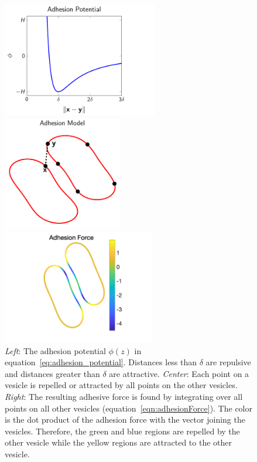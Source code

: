 \documentclass[prf,superscriptaddress,showpacs]{revtex4-1}
\begin{document}
\begin{figure}[htp]
  \begin{minipage}{0.31\textwidth}
    \centering
    \includegraphics[height=5cm,trim={0cm 0cm 2cm 0cm},clip]{figs/adhesionPotential.pdf}
  \end{minipage}
  \hfill
  \begin{minipage}{0.31\textwidth}
    \centering
    \includegraphics[height=5cm]{figs/configCartoon.pdf}
  \end{minipage}
  \hfill
  \begin{minipage}{0.31\textwidth}
    \centering
    \includegraphics[height=5cm,trim={3cm 0cm 2cm 0cm},clip]{figs/Adhesion_Force.png}
  \end{minipage}
  \caption{\label{fig:adhesionModel} {\em Left}: The adhesion potential
  $\phi(z)$ in equation~\eqref{eq:adhesion_potential}.  Distances less
  than $\delta$ are repulsive and distances greater than $\delta$ are
  attractive.  {\em Center}: Each point on a vesicle is repelled or
  attracted by all points on the other vesicles.  {\em Right}: The
  resulting adhesive force is found by integrating over all points on
  all other vesicles (equation~\eqref{eqn:adhesionForce}).  The color is
  the dot product of the adhesion force with the vector joining the
  vesicles.  Therefore, the green and blue regions are repelled by the
  other vesicle while the yellow regions are attracted to the other
  vesicle.}
\end{figure}
\end{document}
